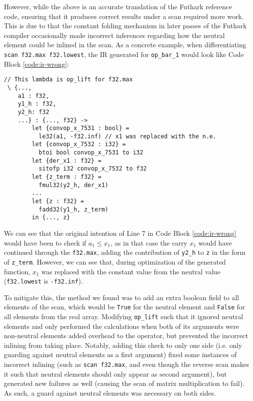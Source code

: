 \documentclass{article}
\newenvironment{code}{\captionsetup{type=listing}}{}
\begin{document}
However, while the above is an accurate translation of the Futhark reference code, ensuring that it produces correct results under a scan required more work. This is due to that the constant folding mechanism in later passes of the Futhark compiler occasionally made incorrect inferences regarding how the neutral element could be inlined in the scan. As a concrete example, when differentiating \lstinline{scan f32.max f32.lowest}, the IR generated for \lstinline{op_bar_1} would look like Code Block \ref{code:ir-wrong}:

\begin{code}
\begin{verbatim}
// This lambda is op_lift for f32.max
 \ {...,
    a1 : f32,
    y1_h : f32,
    y2_h: f32
    ...} : {..., f32} ->
        let {convop_x_7531 : bool} =
          le32(a1, -f32.inf) // x1 was replaced with the n.e.
        let {convop_x_7532 : i32} =
          btoi bool convop_x_7531 to i32
        let {der_x1 : f32} =
          sitofp i32 convop_x_7532 to f32
        let {z_term : f32} =
          fmul32(y2_h, der_x1)
        ...
        let {z : f32} =
          fadd32(y1_h, z_term)
        in {..., z}
\end{verbatim}
\caption{Incorrect IR for \lstinline{op_bar_1}. Names have been changed for clarity.\\}
\label{code:ir-wrong}
\end{code}
\vspace{0.3cm}
We can see that the original intention of Line 7 in Code Block \ref{code:ir-wrong} would have been to check if $a_1 \leq x_1$, as in that case the carry $x_1$ would have continued through the \lstinline{f32.max}, adding the contribution of \lstinline{y2_h} to \lstinline{z} in the form of \lstinline{z_term}. However, we can see that, during optimization of the generated function, $x_1$ was replaced with the constant value from the neutral value (\lstinline{f32.lowest} is \lstinline{-f32.inf}).

To mitigate this, the method we found was to add an extra boolean field to all elements of the scan, which would be \lstinline{True} for the neutral element and \lstinline{False} for all elements from the real array. Modifying \lstinline{op_lift} such that it ignored neutral elements and only performed the calculations when both of its arguments were non-neutral elements added overhead to the operator, but prevented the incorrect inlining from taking place. Notably, adding this check to only one side (i.e. only guarding against neutral elements as a first argument) fixed some instances of incorrect inlining (such as \lstinline{scan f32.max}, and even though the reverse scan makes it such that neutral elements should only appear as second argument), but generated new failures as well (causing the scan of matrix multiplication to fail). As such, a guard against neutral elements was necessary on both sides.
\end{document}

